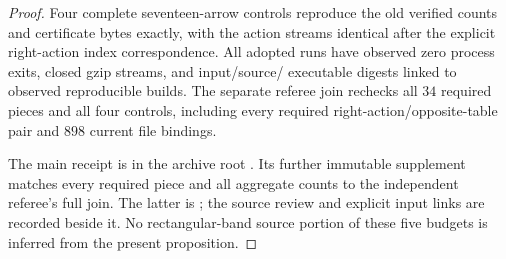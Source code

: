 \begin{proof}
Four complete seventeen-arrow controls reproduce the old
verified counts and certificate bytes exactly, with the
action streams identical after the explicit right-action
index correspondence.  All adopted runs have observed
zero process exits, closed gzip streams, and input/source/
executable digests linked to observed reproducible builds.
The separate referee join rechecks all $34$ required
pieces and all four controls, including every required
right-action/opposite-table pair and $898$ current file
bindings.

The main receipt is
 in the archive
root .
Its further immutable supplement
matches every required piece and all aggregate counts to
the independent referee's full join.  The latter is
;
the source review and explicit input links are recorded
beside it.  No rectangular-band source portion of these
five budgets is inferred from the present proposition.
\end{proof}
